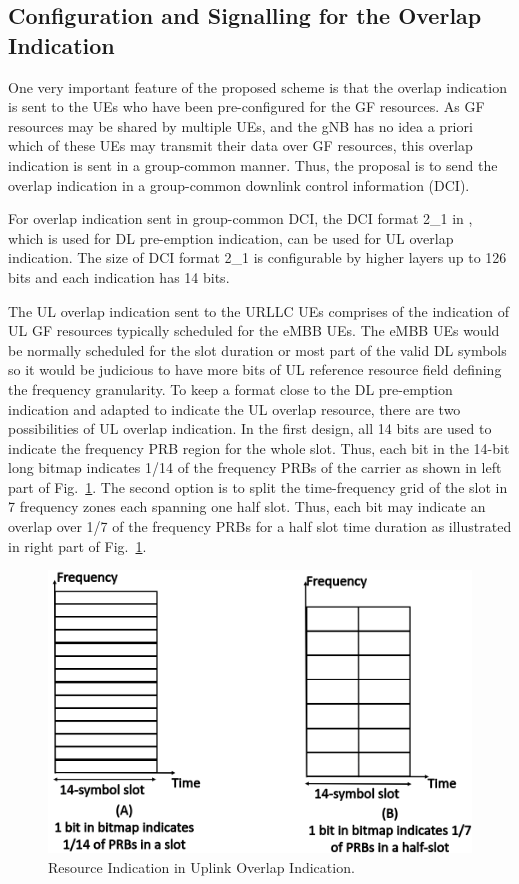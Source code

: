 \documentclass[conference]{IEEEtran}
\begin{document}
\subsection{Configuration and Signalling for the Overlap Indication}\label{IICC}
One very important feature of the proposed scheme is that the overlap indication is sent to the UEs who have been pre-configured for the GF resources. As GF resources may be shared by multiple UEs, and the gNB has no idea a priori which of these UEs may transmit their data over GF resources, this overlap indication is sent in a group-common manner. Thus, the proposal is to send the overlap indication in a group-common downlink control information (DCI).

For overlap indication sent in group-common DCI, the DCI format 2\_1 in \cite{ad6}, which is used for DL pre-emption indication, can be used for UL overlap indication. The size of DCI format 2\_1 is configurable by higher layers up to 126 bits and each indication has 14 bits. 

The UL overlap indication sent to the URLLC UEs comprises of the indication of UL GF resources typically scheduled for the eMBB UEs. The eMBB UEs would be normally scheduled for the slot duration or most part of the valid DL symbols so it would be judicious to have more bits of UL reference resource field defining the frequency granularity. To keep a format close to the DL pre-emption indication and adapted to indicate the UL overlap resource, there are two possibilities of UL overlap indication. In the first design, all 14 bits are used to indicate the frequency PRB region for the whole slot. Thus, each bit in the 14-bit long bitmap indicates 1/14 of the frequency PRBs of the carrier as shown in left part of Fig.~\ref{fig3}. The second option is to split the time-frequency grid of the slot in 7 frequency zones each spanning one half slot. Thus, each bit may indicate an overlap over 1/7 of the frequency PRBs for a half slot time duration as illustrated in right part of Fig.~\ref{fig3}. 

\begin{figure}[htbp]
\centerline{\includegraphics[scale=0.2]{fig3.png}}
\caption{Resource Indication in Uplink Overlap Indication.}
\label{fig3}
\vspace{-6mm}
\end{figure}
\end{document}
